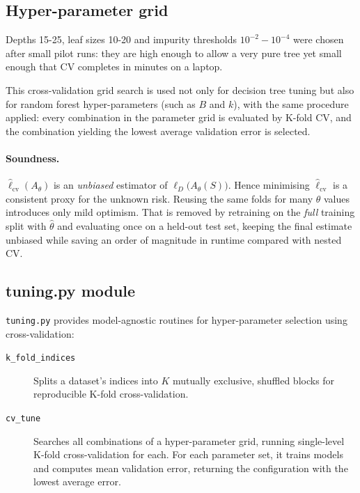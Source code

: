 \documentclass[12pt]{report}
\begin{document}
\subsection{Hyper-parameter grid}
Depths 15-25, leaf sizes 10-20 and impurity thresholds $10^{-2}\!-\!10^{-4}$ were
chosen after small pilot runs: they are high enough to allow a very pure tree yet
small enough that CV completes in minutes on a laptop.

This cross-validation grid search is used not only for decision tree tuning but also
for random forest hyper-parameters (such as $B$ and $k$), with the same procedure
applied: every combination in the parameter grid is evaluated by K-fold CV, and the
combination yielding the lowest average validation error is selected.

\paragraph{Soundness.}
\(\hat \ell_{\mathrm{cv}}(A_{\theta})\) is an \emph{unbiased} estimator of
\(\ell_D\!\bigl(A_\theta(S)\bigr)\). Hence minimising $\widehat{\ell}_{\text{cv}}$
is a consistent proxy for the unknown risk.  Reusing the same folds for many
$\theta$ values introduces only mild optimism. That is removed by retraining
on the \emph{full} training split with $\hat{\theta}$ and evaluating once on a
held-out test set, keeping the final estimate unbiased while saving an order of
magnitude in runtime compared with nested CV.

\subsection{tuning.py module}
\texttt{tuning.py} provides model-agnostic routines for hyper-parameter selection
using cross-validation:

\begin{description}
  \item[\texttt{k\_fold\_indices}]
        Splits a dataset's indices into $K$ mutually exclusive, shuffled blocks for
        reproducible K-fold cross-validation.

  \item[\texttt{cv\_tune}]
        Searches all combinations of a hyper-parameter grid, running single-level
        K-fold cross-validation for each. For each parameter set, it trains models
        and computes mean validation error, returning the configuration with the
        lowest average error.
\end{description}
\end{document}
